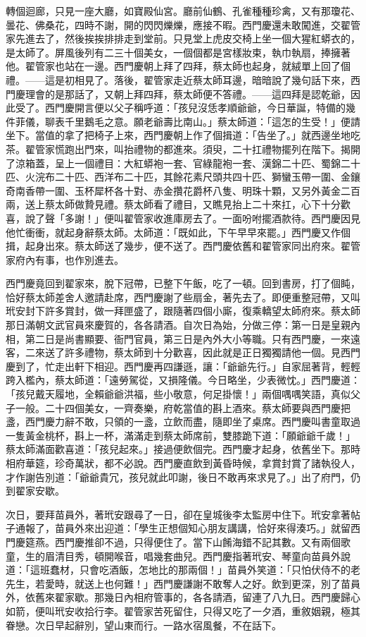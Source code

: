 轉個迴廊，只見一座大廳，如寶殿仙宮。廳前仙鶴、孔雀種種珍禽，又有那瓊花、曇花、佛桑花，四時不謝，開的閃閃爍爍，應接不暇。西門慶還未敢闖進，交翟管家先進去了，然後挨挨排排走到堂前。只見堂上虎皮交椅上坐一個大猩紅蟒衣的，是太師了。屏風後列有二三十個美女，一個個都是宮樣妝束，執巾執扇，捧擁著他。翟管家也站在一邊。西門慶朝上拜了四拜，蔡太師也起身，就絨單上回了個禮。——這是初相見了。落後，翟管家走近蔡太師耳邊，暗暗說了幾句話下來，西門慶理會的是那話了，又朝上拜四拜，蔡太師便不答禮。——這四拜是認乾爺，因此受了。西門慶開言便以父子稱呼道：「孩兒沒恁孝順爺爺，今日華誕，特備的幾件菲儀，聊表千里鵝毛之意。願老爺壽比南山。」蔡太師道：「這怎的生受！」便請坐下。當值的拿了把椅子上來，西門慶朝上作了個揖道：「告坐了。」就西邊坐地吃茶。翟管家慌跑出門來，叫抬禮物的都進來。須臾，二十扛禮物擺列在階下。揭開了涼箱蓋，呈上一個禮目：大紅蟒袍一套、官綠龍袍一套、漢錦二十匹、蜀錦二十匹、火浣布二十匹、西洋布二十匹，其餘花素尺頭共四十匹、獅蠻玉帶一圍、金鑲奇南香帶一圍、玉杯犀杯各十對、赤金攢花爵杯八隻、明珠十顆，又另外黃金二百兩，送上蔡太師做贄見禮。蔡太師看了禮目，又瞧見抬上二十來扛，心下十分歡喜，說了聲「多謝！」便叫翟管家收進庫房去了。一面吩咐擺酒款待。西門慶因見他忙衝衝，就起身辭蔡太師。太師道：「既如此，下午早早來罷。」西門慶又作個揖，起身出來。蔡太師送了幾步，便不送了。西門慶依舊和翟管家同出府來。翟管家府內有事，也作別進去。

西門慶竟回到翟家來，脫下冠帶，已整下午飯，吃了一頓。回到書房，打了個盹，恰好蔡太師差舍人邀請赴席，西門慶謝了些扇金，著先去了。即便重整冠帶，又叫玳安封下許多賞封，做一拜匣盛了，跟隨著四個小廝，復乘轎望太師府來。蔡太師那日滿朝文武官員來慶賀的，各各請酒。自次日為始，分做三停：第一日是皇親內相，第二日是尚書顯要、衙門官員，第三日是內外大小等職。只有西門慶，一來遠客，二來送了許多禮物，蔡太師到十分歡喜，因此就是正日獨獨請他一個。見西門慶到了，忙走出軒下相迎。西門慶再四謙遜，讓：「爺爺先行。」自家屈著背，輕輕跨入檻內，蔡太師道：「遠勞駕從，又損隆儀。今日略坐，少表微忱。」西門慶道：「孩兒戴天履地，全賴爺爺洪福，些小敬意，何足掛懷！」兩個喁喁笑語，真似父子一般。二十四個美女，一齊奏樂，府乾當值的斟上酒來。蔡太師要與西門慶把盞，西門慶力辭不敢，只領的一盞，立飲而盡，隨即坐了桌席。西門慶叫書童取過一隻黃金桃杯，斟上一杯，滿滿走到蔡太師席前，雙膝跪下道：「願爺爺千歲！」蔡太師滿面歡喜道：「孩兒起來。」接過便飲個完。西門慶才起身，依舊坐下。那時相府華筵，珍奇萬狀，都不必說。西門慶直飲到黃昏時候，拿賞封賞了諸執役人，才作謝告別道：「爺爺貴冗，孩兒就此叩謝，後日不敢再來求見了。」出了府門，仍到翟家安歇。

次日，要拜苗員外，著玳安跟尋了一日，卻在皇城後李太監房中住下。玳安拿著帖子通報了，苗員外來出迎道：「學生正想個知心朋友講講，恰好來得湊巧。」就留西門慶筵燕。西門慶推卻不過，只得便住了。當下山餚海錯不記其數。又有兩個歌童，生的眉清目秀，頓開喉音，唱幾套曲兒。西門慶指著玳安、琴童向苗員外說道：「這班蠢材，只會吃酒飯，怎地比的那兩個！」苗員外笑道：「只怕伏侍不的老先生，若愛時，就送上也何難！」西門慶謙謝不敢奪人之好。飲到更深，別了苗員外，依舊來翟家歇。那幾日內相府管事的，各各請酒，留連了八九日。西門慶歸心如箭，便叫玳安收拾行李。翟管家苦死留住，只得又吃了一夕酒，重敘姻親，極其眷戀。次日早起辭別，望山東而行。一路水宿風餐，不在話下。

